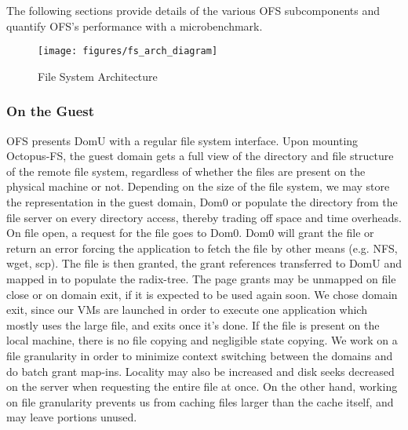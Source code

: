 The following sections provide details of the various OFS subcomponents and quantify OFS's performance with a microbenchmark.

\begin{figure}
\begin{centering}
\texttt{[image: figures/fs\_arch\_diagram]}\caption{\label{fig:fsdiagram}File System Architecture}
\par\end{centering}
\end{figure}


\subsubsection{On the Guest}
OFS presents DomU with a regular file system interface. Upon mounting Octopus-FS, the guest domain gets a full view of the directory and file structure of the remote file system, regardless of whether the files are present on the physical machine or not. Depending on the size of the file system, we may store the representation in the guest domain, Dom0 or populate the directory from the file server on every directory access, thereby trading off space and time overheads.
On file open, a request for the file goes to Dom0. Dom0 will grant the file or return an error forcing the application to fetch the file by other means (e.g. NFS, wget, scp). 
The file is then granted, the grant references transferred to DomU and mapped in to populate the radix-tree.
The page grants may be unmapped on file close or on domain exit, if it is expected to be used again soon. We chose domain exit, since our VMs are launched in order to execute one application which mostly uses the large file, and exits once it's done. If the file is present on the local machine, there is no file copying and negligible state copying.
We work on a file granularity in order to minimize context switching between the domains and do batch grant map-ins. Locality may also be increased and disk seeks decreased on the server when requesting the entire file at once. On the other hand, working on file granularity prevents us from caching files larger than the cache itself, and may leave portions unused. 

